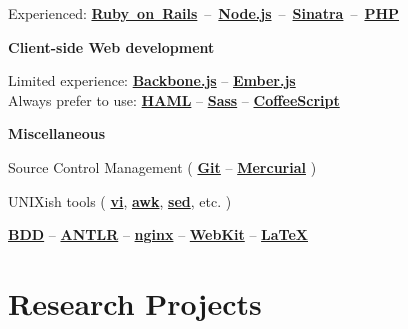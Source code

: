 \documentclass{tccv}
\begin{document}
\hspace{2pt}%
Experienced: %
\mbox{\href{http://rubyonrails.org}{\bf Ruby on Rails} -- %
     \href{http://nodejs.org}{\bf Node.js} -- %
     \href{http://www.sinatrarb.com}{\bf Sinatra} -- %
     \href{http://php.net}{\bf PHP}%
}



\vspace{6pt}%
\hspace{-1pt}%
\textsf{\textbf{Client-side Web development}}
	 
\hspace{2pt}%
Limited experience: %
     \href{http://backbonejs.org}{\bf Backbone.js} -- %
     \href{http://emberjs.com}{\bf Ember.js}%
\\
Always prefer to use: %
     \href{http://haml.info}{\bf HAML} -- %
     \href{http://sass-lang.com}{\bf Sass} -- %
     \href{http://coffeescript.org}{\bf CoffeeScript}%



\vspace{6pt}%
\hspace{-1pt}%
\textsf{\textbf{Miscellaneous}}

\hspace{2pt}%
Source Control Management (%
	\href{http://git-scm.com}{\bf Git} -- %
	\href{http://www.selenic.com/mercurial/}{\bf Mercurial}%
)%

\hspace{2pt}%
UNIXish tools (%
	\href{http://www.vim.org}{\bf vi}, %
	\href{http://awk.info}{\bf awk}, %
	\href{http://www.gnu.org/software/sed/}{\bf sed}, etc.%
)%

\hspace{2pt}%
	\href{http://en.wikipedia.org/wiki/Behavior-driven_development}{\bf BDD} -- %
	\href{http://www.antlr.org}{\bf ANTLR} -- %
	\href{http://nginx.org/en/}{\bf nginx} -- %
	\href{http://www.webkit.org}{\bf WebKit} -- %
	\href{http://www.latex-project.org}{\bf \LaTeX}





\section{Research Projects}
\end{document}
